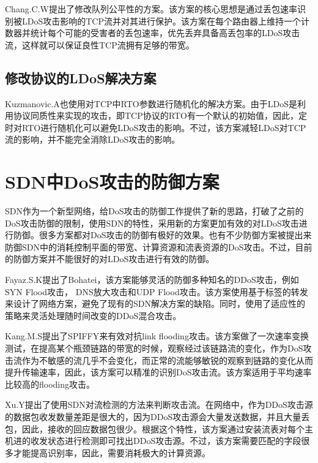 Chang.C.W\cite{b8}提出了修改队列公平性的方案。该方案的核心思想是通过丢包速率识别被LDoS攻击影响的TCP流并对其进行保护。该方案在每个路由器上维持一个计数器并统计每个可能的受害者的丢包速率，优先丢弃具备高丢包率的LDoS攻击流，这样就可以保证良性TCP流拥有足够的带宽。


\subsection{修改协议的LDoS解决方案}
\label{chap2:promodify}
Kuzmanovic.A\cite{Kuzmanovic2006Low}也使用对TCP中RTO参数进行随机化的解决方案。由于LDoS是利用协议同质性来实现的攻击，即TCP协议的RTO有一个默认的初始值，因此，定时对RTO进行随机化可以避免LDoS攻击的影响。不过，该方案减轻LDoS对TCP流的影响，并不能完全消除LDoS攻击的影响。




\section{SDN中DoS攻击的防御方案}
SDN作为一个新型网络，给DoS攻击的防御工作提供了新的思路，打破了之前的DoS攻击防御的限制，使用SDN的特性，采用新的方案更加有效的对LDoS攻击进行防御。很多方案\cite{b9, b16, b10}都对DoS攻击的防御有极好的效果。也有不少防御方案\cite{b10, b12, b13, b15, b18,wang2015floodguard,zhang2017ftguard}被提出来防御SDN中的消耗控制平面的带宽、计算资源和流表资源的DoS攻击\cite{shin2013avant,cao2017disrupting}。不过，目前的防御方案并不能很好的对LDoS攻击进行有效的防御。


Fayaz.S.K\cite{b9}提出了Bohatei，该方案能够灵活的防御多种知名的DDoS攻击，例如SYN Flood攻击， DNS放大攻击和UDP Flood攻击。该方案使用基于标签的转发来设计了网络方案，避免了现有的SDN解决方案的缺陷。同时，使用了适应性的策略来灵活处理随时间改变的DDoS混合攻击。

Kang.M.S\cite{b16}提出了SPIFFY来有效对抗link flooding攻击。该方案做了一次速率变换测试，在提高某个瓶颈链路的带宽的时候，观察经过该链路流的变化，作为DoS攻击流作为不敏感的流几乎不会变化，而正常的流能够敏锐的观察到链路的变化从而提升传输速率，因此，该方案可以精准的识别DoS攻击流。该方案适用于平均速率比较高的flooding攻击。

Xu.Y\cite{b10}提出了使用SDN对流检测的方法来判断攻击流。在网络中，作为DDoS攻击源的数据包收发数量差距是很大的，因为DDoS攻击源会大量发送数据，并且大量丢包，因此，接收的回应数据包很少。根据这个特性，该方案通过安装流表对每个主机进的收发状态进行检测即可找出DDoS攻击源。不过，该方案需要匹配的字段很多才能提高识别率，因此，需要消耗极大的计算资源。


